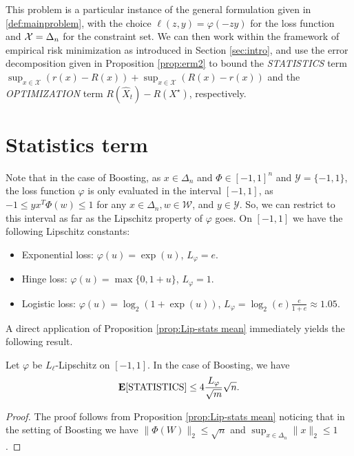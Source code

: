 This problem is a particular instance of the general formulation given in \eqref{def:mainproblem}, with the choice $\ell(z,y) = \varphi(-zy)$ for the loss function and $\mathcal{X}=\Delta_n$ for the constraint set. We can then work within the framework of empirical risk minimization as introduced in Section \ref{sec:intro}, and use the error decomposition given in Proposition \ref{prop:erm2} to bound the \emph{STATISTICS} term $\sup_{x\in\mathcal{X}} ( r(x) - R(x) ) + \sup_{x\in\mathcal{X}} ( R(x) - r(x) )$ and the \emph{OPTIMIZATION} term $R(\hat X_t) - R(X^\star)$, respectively.

\section{Statistics term}
Note that in the case of Boosting, as $x\in\Delta_n$ and $\Phi\in[-1,1]^n$ and $\mathcal{Y}=\{-1,1\}$, the loss function $\varphi$ is only evaluated in the interval $[-1,1]$, as $-1 \le yx^T\Phi(w) \le 1$ for any $x\in\Delta_n,w\in\mathcal{W}$, and $y\in\mathcal{Y}$. So, we can restrict to this interval as far as the Lipschitz property of $\varphi$ goes. On $[-1,1]$ we have the following Lipschitz constants:
\begin{itemize}
\item Exponential loss: $\varphi(u) = \exp(u)$, $L_\varphi = e$.
\item Hinge loss: $\varphi(u) = \max\{0,1+u\}$, $L_\varphi = 1$.
\item Logistic loss: $\varphi(u) = \log_2(1+\exp(u))$, $L_\varphi = \log_2(e)\frac{e}{1+e}\approx 1.05$.
\end{itemize}


A direct application of Proposition \ref{prop:Lip-stats mean} immediately yields the following result.
\begin{corollary}
\label{cor:Lip-stats Boosting}
Let $\varphi$ be $L_\ell$-Lipschitz on $[-1,1]$. In the case of Boosting, we have
$$
	\mathbf{E}[\textrm{STATISTICS}] 
	\le 4\frac{L_\varphi}{\sqrt{m}}\sqrt{n}.
$$
\end{corollary}

\begin{proof}
The proof follows from Proposition \ref{prop:Lip-stats mean} noticing that in the setting of Boosting we have $\|\Phi(W)\|_2\le \sqrt{n}$ and $\sup_{x\in\Delta_n}\|x\|_2 \le 1$.
\end{proof}

